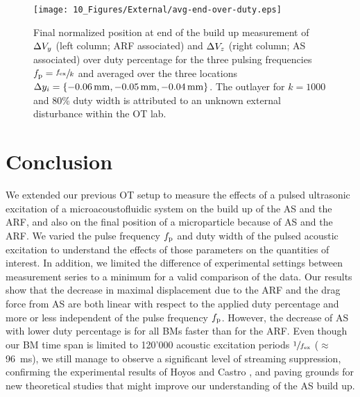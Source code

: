 \begin{figure*}[tbp]
  \centering
  \texttt{[image: 10\_Figures/External/avg-end-over-duty.eps]}
  \caption{Final normalized position at end of the build up measurement of 
  $\Delta V_{y}$ (left column; ARF associated) and $\Delta V_{z}$ (right column; AS 
  associated) over duty percentage for the three pulsing frequencies 
  $f_{\mathrm{p}}=\sfrac{f_{\mathrm{ex}}}{k}$ and averaged over the three locations $\Dy_{i} =
\{\SI{-0.06}{\mm},\SI{-0.05}{\mm},\SI{-0.04}{\mm}\}$. The outlayer for $k=1000$ 
and 80\% duty width is attributed to an unknown external disturbance within the 
OT lab.}\label{fig:all-duty}
\end{figure*}

\section{Conclusion}
We extended our previous OT setup to measure the effects of a pulsed ultrasonic 
excitation of a microacoustofluidic system on the build up of the AS and the 
ARF, and also on the final position of a microparticle because of AS and the 
ARF. We varied the pulse frequency $f_{\mathrm{p}}$ and duty width of the pulsed acoustic 
excitation to understand the effects of those parameters on the quantities of 
interest. In addition, we limited the difference of experimental settings 
between measurement series to a minimum for a valid comparison of the data. Our 
results show that the decrease in maximal displacement due to the ARF and the 
drag force from AS are both linear with respect to the applied duty percentage 
and more or less independent of the pulse frequency $f_{\mathrm{p}}$. However, the 
decrease of AS with lower duty percentage is for all BMs faster than for the 
ARF. Even though our BM time span is limited to 120'000 acoustic excitation 
periods $\sfrac{1}{f_{\mathrm{ex}}}$ ($\approx$ \SI{96}{\ms}), we still manage to observe 
a significant level of streaming suppression, confirming the experimental 
results of Hoyos and Castro \cite{Castro2016,Hoyos2013}, and paving grounds for 
new theoretical studies that might improve our understanding of the AS build 
up.




